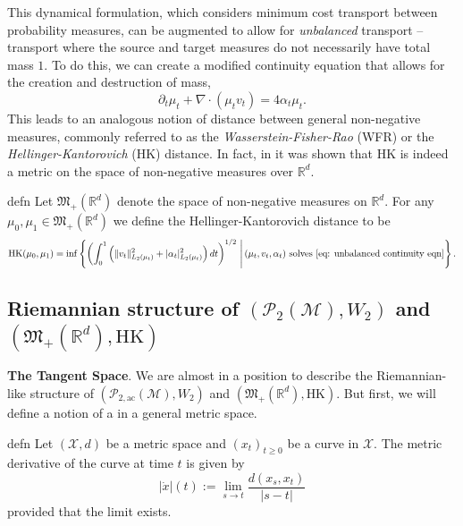 \documentclass{article}
\newcommand{\man}{\mathcal{M}}
\begin{document}
This dynamical formulation, which considers minimum cost transport between probability measures, can be augmented to allow for \textit{unbalanced} transport -- transport where the source and target measures do not necessarily have total mass $1$. To do this, we can create a modified continuity equation that allows for the creation and destruction of mass,
\begin{equation}
    \partial_t\mu_t + \nabla \cdot (\mu_tv_t) = 4\alpha_t\mu_t. \label{eq: unbalanced continuity eqn}
\end{equation}
This leads to an analogous notion of distance between general non-negative measures, commonly referred to as the \textit{Wasserstein-Fisher-Rao} (WFR) or the \textit{Hellinger-Kantorovich} (HK) distance. In fact, in \citet{liero2018optimal} it was shown that HK is indeed a metric on the space of non-negative measures over $\mathbb{R}^d$. 

\begin{restatable}{defn}{}
    Let $\mathfrak{M}_+(\mathbb{R}^d)$ denote the space of non-negative measures on $\mathbb{R}^d$. For any $\mu_0, \mu_1 \in \mathfrak{M}_+(\mathbb{R}^d)$ we define the Hellinger-Kantorovich distance to be
    \begin{equation}
        \text{HK}(\mu_0, \mu_1) = \inf\left\{\left(\int_0^1 \left(\|v_t\|_{L_2(\mu_t)}^2 + |\alpha_t|_{L_2(\mu_t)}^2\right)dt\right)^{1/2} \, \Bigg| \, (\mu_t, v_t,  \alpha_t) \text{ solves \cref{eq: unbalanced continuity eqn}}\right\}.
    \end{equation}
\end{restatable}

\subsection{Riemannian structure of $(\mathcal{P}_{2}(\man), W_2)$ and $(\mathfrak{M}_+(\mathbb{R}^d), \text{HK})$}

\textbf{The Tangent Space}. We are almost in a position to describe the Riemannian-like structure of $(\mathcal{P}_{2, \text{ac}}(\man), W_2)$ and $(\mathfrak{M}_+(\mathbb{R}^d), \text{HK})$. But first, we will define a notion of a  in a general metric space.

\begin{restatable}{defn}{}
    Let $(\mathcal{X}, d)$ be a metric space and $(x_t)_{t \geq 0}$ be a curve in $\mathcal{X}$. The metric derivative of the curve at time $t$ is given by
    \begin{equation*}
        |\dot x|(t) := \lim_{s\rightarrow t}\frac{d(x_s, x_t)}{|s - t|}
    \end{equation*}
    provided that the limit exists. 
\end{restatable}
\end{document}
